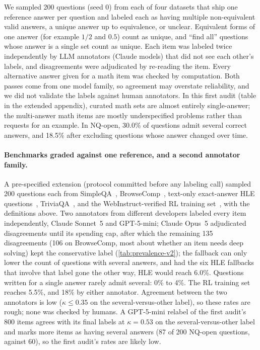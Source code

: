 We sampled 200 questions (seed 0) from each of four datasets that ship one reference answer per question and labeled each as having multiple non-equivalent valid answers, a unique answer up to equivalence, or unclear. Equivalent forms of one answer (for example $1/2$ and $0.5$) count as unique, and ``find all'' questions whose answer is a single set count as unique. Each item was labeled twice independently by LLM annotators (Claude models) that did not see each other's labels, and disagreements were adjudicated by re-reading the item. Every alternative answer given for a math item was checked by computation. Both passes come from one model family, so agreement may overstate reliability, and we did not validate the labels against human annotators.
In this first audit (table in the extended appendix), curated math sets are almost entirely single-answer; the multi-answer math items are mostly underspecified problems rather than requests for an example. In NQ-open, 30.0\% of questions admit several correct answers, and 18.5\% after excluding questions whose answer changed over time.

\paragraph{Benchmarks graded against one reference, and a second annotator family.} A pre-specified extension (protocol committed before any labeling call) sampled 200 questions each from SimpleQA~\citep{wei2024simpleqa}, BrowseComp~\citep{wei2025browsecomp}, text-only exact-answer HLE questions~\citep{phan2025hle}, TriviaQA~\citep{joshi2017triviaqa}, and the WebInstruct-verified RL training set~\citep{ma2025generalreasoner}, with the definitions above. Two annotators from different developers labeled every item independently, Claude Sonnet~5 and GPT-5-mini; Claude Opus~5 adjudicated disagreements until its spending cap, after which the remaining 135 disagreements (106 on BrowseComp, most about whether an item needs deep solving) kept the conservative label (\cref{tab:prevalence-v2}); the fallback can only lower the count of questions with several answers, and had the six HLE fallbacks that involve that label gone the other way, HLE would reach 6.0\%. Questions written for a single answer rarely admit several: 0\% to 4\%. The RL training set reaches 5.5\%, and 18\% by either annotator. Agreement between the two annotators is low ($\kappa \le 0.35$ on the several-versus-other label), so these rates are rough; none was checked by humans. A GPT-5-mini relabel of the first audit's 800 items agrees with its final labels at $\kappa = 0.53$ on the several-versus-other label and marks more items as having several answers (87 of 200 NQ-open questions, against 60), so the first audit's rates are likely low.

